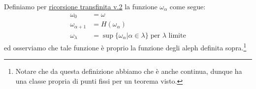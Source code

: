 \begin{proposition}
	Definiamo per \hyperref[ric_transf2]{ricorsione transfinita v.2} la funzione $\omega_\alpha$ come segue:
	\begin{align*}
		\omega_0 &= \omega \\
		\omega_{\alpha + 1} &= H(\omega_\alpha) \\
		\omega_\lambda &= \sup\{\omega_\alpha | \alpha \in \lambda\} \; \text{per $\lambda$ limite}
	\end{align*}
	ed osserviamo che tale funzione \`e proprio la funzione degli aleph definita sopra.\footnote{Notare che da questa definizione abbiamo che \`e anche continua, dunque ha una classe propria di punti fissi per un teorema visto.}
\end{proposition}

